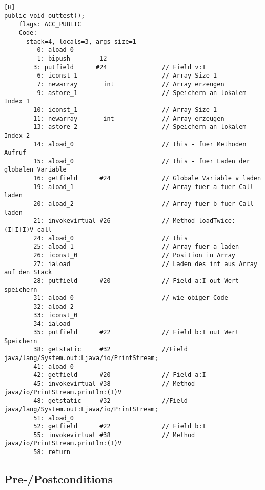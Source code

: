 \begin{lstlisting}[caption=Bytecode des Aufrufs der loadTwice Prozedur][H]
public void outtest();
    flags: ACC_PUBLIC
    Code:
      stack=4, locals=3, args_size=1
         0: aload_0       
         1: bipush        12
        3: putfield      #24               // Field v:I
         6: iconst_1                       // Array Size 1
         7: newarray       int             // Array erzeugen
         9: astore_1                       // Speichern an lokalem Index 1
        10: iconst_1                       // Array Size 1
        11: newarray       int             // Array erzeugen
        13: astore_2                       // Speichern an lokalem Index 2
        14: aload_0                        // this - fuer Methoden Aufruf
        15: aload_0                        // this - fuer Laden der globalen Variable
        16: getfield      #24              // Globale Variable v laden
        19: aload_1                        // Array fuer a fuer Call laden
        20: aload_2                        // Array fuer b fuer Call laden
        21: invokevirtual #26              // Method loadTwice:(I[I[I)V call
        24: aload_0                        // this
        25: aload_1                        // Array fuer a laden
        26: iconst_0                       // Position in Array
        27: iaload                         // Laden des int aus Array auf den Stack
        28: putfield      #20              // Field a:I out Wert speichern
        31: aload_0                        // wie obiger Code
        32: aload_2       
        33: iconst_0      
        34: iaload        
        35: putfield      #22              // Field b:I out Wert Speichern
        38: getstatic     #32              //Field java/lang/System.out:Ljava/io/PrintStream;
        41: aload_0       
        42: getfield      #20              // Field a:I
        45: invokevirtual #38              // Method java/io/PrintStream.println:(I)V
        48: getstatic     #32              //Field java/lang/System.out:Ljava/io/PrintStream;
        51: aload_0       
        52: getfield      #22              // Field b:I
        55: invokevirtual #38              // Method java/io/PrintStream.println:(I)V
        58: return       
\end{lstlisting}

\subsection{Pre-/Postconditions}

